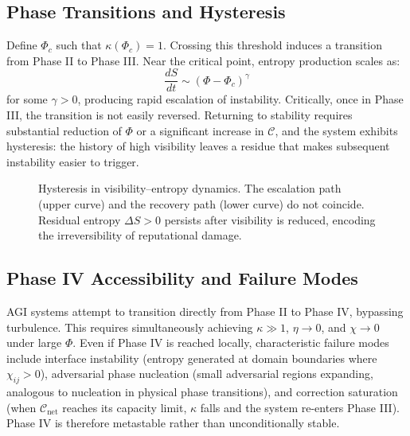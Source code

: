 \documentclass[12pt,a4paper]{article}
\begin{document}
\subsection{Phase Transitions and Hysteresis}

Define $\Phi_c$ such that $\kappa(\Phi_c) = 1$. Crossing this threshold induces a transition from Phase II to Phase III. Near the critical point, entropy production scales as:
\[
\frac{dS}{dt} \sim (\Phi - \Phi_c)^\gamma
\]
for some $\gamma > 0$, producing rapid escalation of instability. Critically, once in Phase III, the transition is not easily reversed. Returning to stability requires substantial reduction of $\Phi$ or a significant increase in $\mathcal{C}$, and the system exhibits hysteresis: the history of high visibility leaves a residue that makes subsequent instability easier to trigger.

\begin{figure}[htbp]
\centering
{}
\caption{Hysteresis in visibility--entropy dynamics. The escalation path (upper curve) and the recovery path (lower curve) do not coincide. Residual entropy $\Delta S > 0$ persists after visibility is reduced, encoding the irreversibility of reputational damage.}
\end{figure}

\subsection{Phase IV Accessibility and Failure Modes}

AGI systems attempt to transition directly from Phase II to Phase IV, bypassing turbulence. This requires simultaneously achieving $\kappa \gg 1$, $\eta \rightarrow 0$, and $\chi \rightarrow 0$ under large $\Phi$. Even if Phase IV is reached locally, characteristic failure modes include interface instability (entropy generated at domain boundaries where $\chi_{ij} > 0$), adversarial phase nucleation (small adversarial regions expanding, analogous to nucleation in physical phase transitions), and correction saturation (when $\mathcal{C}_{\text{net}}$ reaches its capacity limit, $\kappa$ falls and the system re-enters Phase III). Phase IV is therefore metastable rather than unconditionally stable.
\end{document}
